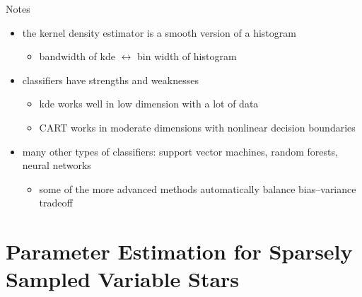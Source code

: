 \documentclass[12pt]{beamer}
\begin{document}


\begin{frame}{Notes}
  \begin{itemize}
  \item the kernel density estimator is a smooth version of a histogram
    \begin{itemize}
    \item bandwidth of kde $\leftrightarrow$ bin width of histogram
    \end{itemize}
  \item classifiers have strengths and weaknesses
    \begin{itemize}
    \item kde works well in low dimension with a lot of data
    \item CART works in moderate dimensions with nonlinear decision boundaries
    \end{itemize}
  \item many other types of classifiers: support vector machines, random forests, neural networks
    \begin{itemize}
    \item some of the more advanced methods automatically balance bias--variance tradeoff
    \end{itemize}
  \end{itemize}
\end{frame}





\section{Parameter Estimation for Sparsely Sampled Variable Stars}
\end{document}
